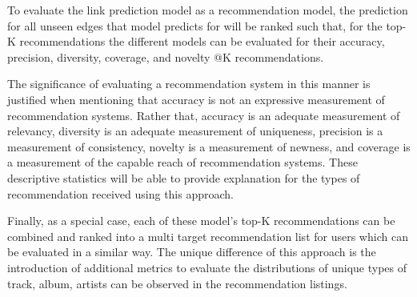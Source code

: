 To evaluate the link prediction model as a recommendation model, the prediction for all unseen edges that model predicts for will be ranked such that, for the top-K recommendations the different models can be evaluated for their accuracy, precision, diversity, coverage, and novelty @K recommendations.


The significance of evaluating a recommendation system in this manner is justified when mentioning that accuracy is not an expressive measurement of recommendation systems. Rather that, accuracy is an adequate measurement of relevancy, diversity is an adequate measurement of uniqueness, precision is a measurement of consistency, novelty is a measurement of newness, and coverage is a measurement of the capable reach of recommendation systems. These descriptive statistics will be able to provide explanation for the types of recommendation received using this approach.

Finally, as a special case, each of these model’s top-K recommendations can be combined and ranked into a multi target recommendation list for users which can be evaluated in a similar way. The unique difference of this approach is the introduction of additional metrics to evaluate the distributions of unique types of track, album, artists can be observed in the recommendation listings.
